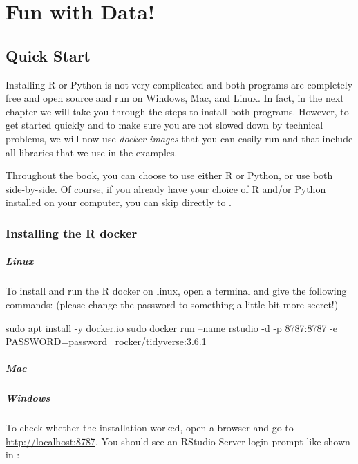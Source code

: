 \chapter{Fun with Data!}

\section{Quick Start}

Installing R or Python is not very complicated and both programs are completely free and open source and run on Windows, Mac, and Linux.
In fact, in the next chapter we will take you through the steps to install both programs.
However, to get started quickly and to make sure you are not slowed down by technical problems,
we will now use \emph{docker images} that you can easily run and that include all libraries that we use in the examples.

Throughout the book, you can choose to use either R or Python, or use both side-by-side.
Of course, if you already have your choice of R and/or Python installed on your computer, you can skip directly to . 

\subsection{Installing the R docker}

\paragraph{Linux} To install and run the R docker on linux, open a terminal and give the following commands:
(please change the password to something a little bit more secret!)

\begin{terminal}
sudo apt install -y docker.io
sudo docker run --name rstudio -d -p 8787:8787 -e PASSWORD=password \
     rocker/tidyverse:3.6.1
\end{terminal}


\paragraph{Mac}

\paragraph{Windows} 

To check whether the installation worked, open a browser and go to \url{http://localhost:8787}.
You should see an RStudio Server login prompt like shown in \reffig{fun.rstudio.signin}:

